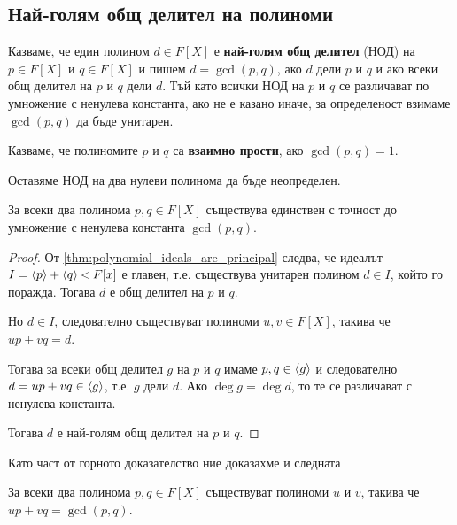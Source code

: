 \documentclass[
  headings=standardclasses,
  bibliography=totocnumbered,
]{scrartcl}
\begin{document}
\subsection{Най-голям общ делител на полиноми}

\begin{definition}
  Казваме, че един полином \( d \in F[X] \) е \textbf{най-голям общ делител} (НОД) на \( p \in F[X] \) и \( q \in F[X] \) и пишем \( d = \gcd(p, q) \), ако \( d \) дели \( p \) и \( q \) и ако всеки общ делител на \( p \) и \( q \) дели \( d \). Тъй като всички НОД на \( p \) и \( q \) се различават по умножение с ненулева константа, ако не е казано иначе, за определеност взимаме \( \gcd(p, q) \) да бъде унитарен.

  Казваме, че полиномите \( p \) и \( q \) са \textbf{взаимно прости}, ако \( \gcd(p, q) = 1 \).

  Оставяме НОД на два нулеви полинома да бъде неопределен.
\end{definition}

\begin{theorem}
  За всеки два полинома \( p, q \in F[X] \) съществува единствен с точност до умножение с ненулева константа \( \gcd(p, q) \).
\end{theorem}
\begin{proof}
  От \cref{thm:polynomial_ideals_are_principal} следва, че идеалът \( I = \left\langle p \right\rangle + \left\langle q \right\rangle \lhd F[x] \) е главен, т.е. съществува унитарен полином \( d \in I \), който го поражда.
  Тогава \( d \) е общ делител на \( p \) и \( q \).

  Но \( d \in I \), следователно съществуват полиноми \( u, v \in F[X] \), такива че \( u p + v q = d \).

  Тогава за всеки общ делител \( g \) на \( p \) и \( q \) имаме \( p, q \in \left\langle g \right\rangle \) и следователно \( d = u p + v q \in \left\langle g \right\rangle \), т.е. \( g \) дели \( d \). Ако \( \deg g = \deg d \), то те се различават с ненулева константа.

  Тогава \( d \) е най-голям общ делител на \( p \) и \( q \).
\end{proof}

Като част от горното доказателство ние доказахме и следната
\begin{theorem}
  За всеки два полинома \( p, q \in F[X] \) съществуват полиноми \( u \) и \( v \), такива че \( u p + v q = \gcd(p, q) \).
\end{theorem}
\end{document}

